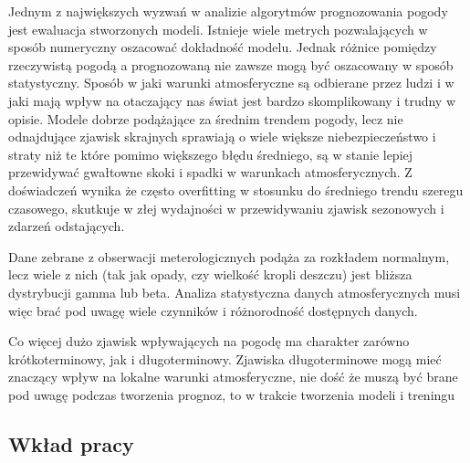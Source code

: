 Jednym z największych wyzwań w analizie algorytmów prognozowania pogody jest ewaluacja 
stworzonych modeli. Istnieje wiele metrych pozwalających w sposób numeryczny oszacować
dokładność modelu. Jednak różnice pomiędzy rzeczywistą pogodą a prognozowaną nie zawsze
mogą być oszacowany w sposób statystyczny. Sposób w jaki warunki atmosferyczne są odbierane
przez ludzi i w jaki mają wpływ na otaczający nas świat jest bardzo skomplikowany i trudny
w opisie. Modele dobrze podążające za średnim trendem pogody, lecz nie odnajdujące
zjawisk skrajnych sprawiają o wiele większe niebezpieczeństwo i straty niż te które
pomimo większego błędu średniego, są w stanie lepiej przewidywać gwałtowne skoki i spadki
w warunkach atmosferycznych. Z doświadczeń wynika że często overfitting w stosunku do
średniego trendu szeregu czasowego, skutkuje w złej wydajności w przewidywaniu
zjawisk sezonowych i zdarzeń odstających.

Dane zebrane z obserwacji meterologicznych podąża za
rozkładem normalnym, lecz wiele z nich (tak jak opady, czy wielkość kropli deszczu) 
\cite{can-dl-beat-numerical} jest bliższa dystrybucji gamma lub beta. Analiza statystyczna
danych atmosferycznych musi więc brać pod uwagę wiele czynników i różnorodność dostępnych danych.

Co więcej dużo zjawisk wpływających na pogodę ma charakter zarówno krótkoterminowy, jak i 
długoterminowy. Zjawiska długoterminowe mogą mieć znaczący wpływ na lokalne warunki atmosferyczne,
nie dość że muszą być brane pod uwagę podczas tworzenia prognoz, to w trakcie tworzenia modeli
i treningu 




\subsection{Wkład pracy}